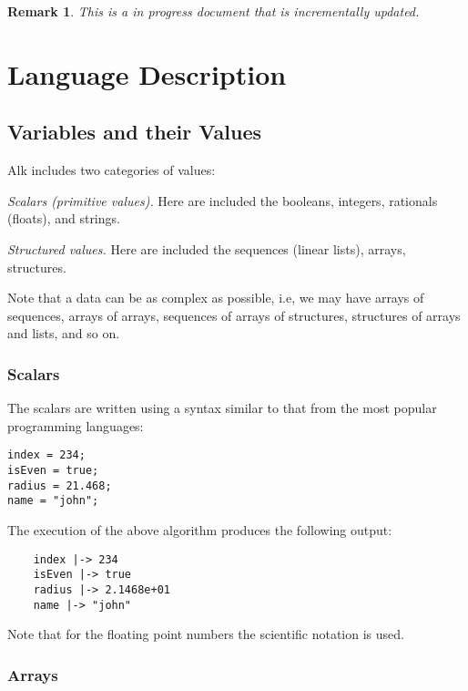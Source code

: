\documentclass[a4paper]{report}
\newtheorem*{remark}{Remark}
\begin{document}
\begin{remark}
This is a in progress document that is incrementally updated.
\end{remark}

\chapter{Language Description}

\section{Variables and their Values}

Alk includes two categories of values:
\begin{list}{}{3ex}
\item[\it Scalars (primitive values).] Here are included the booleans, integers, rationals (floats), and strings. 
\item[\it Structured values.] Here are included the  sequences (linear lists), arrays, structures. 
\end{list} 
Note that a data can be as complex as possible, i.e, we may have arrays of sequences, arrays of arrays, sequences of arrays of structures, structures of arrays and lists, and so on.

\subsection{Scalars}

The scalars are written using a syntax similar to that from the most popular programming languages: 
\begin{verbatim}
index = 234;
isEven = true;
radius = 21.468;
name = "john";
\end{verbatim}
The execution of the above algorithm produces the following output:
\begin{verbatim}
    index |-> 234
    isEven |-> true
    radius |-> 2.1468e+01
    name |-> "john"
\end{verbatim}
Note that for the floating point numbers the scientific notation is used.

\subsection{Arrays}
\end{document}
